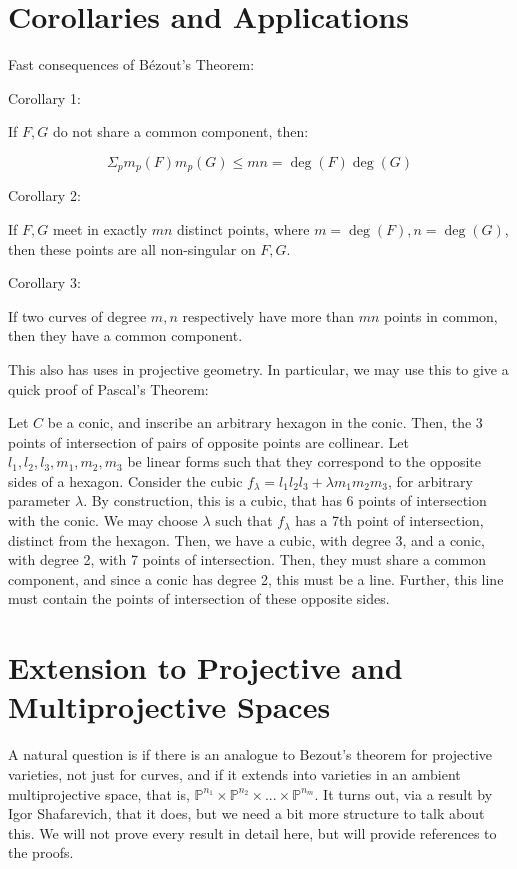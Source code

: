 \documentclass[10pt]{article}
\begin{document}
\section{Corollaries and Applications}

Fast consequences of B\'ezout's Theorem:

Corollary 1:

If $F,G$ do not share a common component, then:

$$ \Sigma_p m_p(F) m_p(G) \leq mn = \deg(F) \deg(G) $$

Corollary 2:

If $F,G$ meet in exactly $mn$ distinct points, where $m = \deg(F), n = \deg(G)$, then these points are all non-singular on $F,G$.

Corollary 3:

If two curves of degree $m,n$ respectively have more than $mn$ points in common, then they have a common component.

This also has uses in projective geometry. In particular, we may use this to give a quick proof of Pascal's Theorem:

Let $C$ be a conic, and inscribe an arbitrary hexagon in the conic. Then, the 3 points of intersection of pairs of opposite points are collinear. Let $l_1, l_2, l_3, m_1, m_2, m_3$ be linear forms such that they correspond to the opposite sides of a hexagon. Consider the cubic $f_\lambda = l_1 l_2 l_3 + \lambda m_1 m_2 m_3$, for arbitrary parameter $\lambda$. By construction, this is a cubic, that has 6 points of intersection with the conic. We may choose $\lambda$ such that $f_\lambda$ has a 7th point of intersection, distinct from the hexagon. Then, we have a cubic, with degree 3, and a conic, with degree 2, with 7 points of intersection. Then, they must share a common component, and since a conic has degree 2, this must be a line. Further, this line must contain the points of intersection of these opposite sides.

\section{Extension to Projective and Multiprojective Spaces}

A natural question is if there is an analogue to Bezout's theorem for projective varieties, not just for curves, and if it extends into varieties in an ambient multiprojective space, that is, $\mathbb{P}^{n_1} \times \mathbb{P}^{n_2} \times ... \times \mathbb{P}^{n_m}$. It turns out, via a result by Igor Shafarevich, that it does, but we need a bit more structure to talk about this. We will not prove every result in detail here, but will provide references to the proofs.
\end{document}
